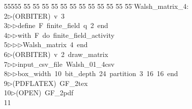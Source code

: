 %
%
\begin{tabbing}
55555 \= 55 \= 55 \= 55 \= 55 \= 55 \= 55 \= 55 \= 55 \= 55 \= 55 \= 55 \= 55 \= \>Walsh\_matrix\_4:\\[0pt]
2\>$\triangleright$\>(ORBITER)\ v\ 3\ \\[0pt]
3\>$\triangleright$\>$\triangleright$\>define\ F\ finite\_field\ q\ 2\ end\ \\[0pt]
4\>$\triangleright$\>$\triangleright$\>with\ F\ do\ finite\_field\_activity\ \\[0pt]
5\>$\triangleright$\>$\triangleright$\>$\triangleright$\>Walsh\_matrix\ 4\ end\\[0pt]
6\>$\triangleright$\>(ORBITER)\ v\ 2\ draw\_matrix\ \\[0pt]
7\>$\triangleright$\>$\triangleright$\>input\_csv\_file\ Walsh\_01\_4csv\ \\[0pt]
8\>$\triangleright$\>$\triangleright$\>box\_width\ 10\ bit\_depth\ 24\ partition\ 3\ 16\ 16\ end\\[0pt]
9\>$\triangleright$\>(PDFLATEX)\ GF\_2tex\\[0pt]
10\>$\triangleright$\>(OPEN)\ GF\_2pdf\\[0pt]
11\>\end{tabbing}
